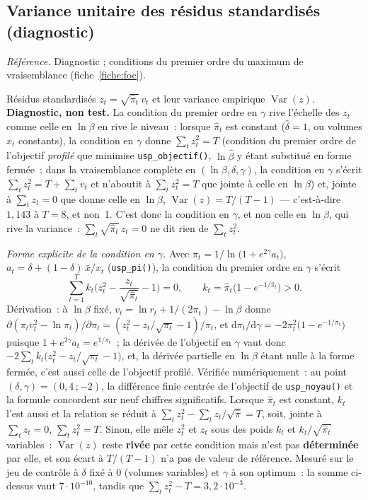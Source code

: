 \documentclass[a4paper,11pt]{article}
\newcommand{\code}[1]{\texttt{\small #1}}
\newcommand{\refl}[1]{{\small\textcolor{maincolor!70!black}{\textit{Référence.} #1}}\par\smallskip}
\newcounter{ficheid}
\newenvironment{fiche}[1]{%
  \stepcounter{ficheid}%
  \phantomsection
  \subsection{#1}%
  \label{fiche:\theficheid}%
}{%
  \end{description}\vspace{0.5em}%
}
\newcommand{\Cadre}{%
  \begin{description}[leftmargin=0pt, style=unboxed, itemsep=3pt, topsep=3pt, parsep=2pt]%
  \item[\textcolor{financeblue}{\textbf{1. Cadre, notations et hypothèses de validité (non testées).}}]}
\begin{document}
\begin{fiche}{Variance unitaire des résidus standardisés (diagnostic)}
\label{fiche:variance-unitaire}%
\refl{Diagnostic ; conditions du premier ordre du maximum de vraisemblance
(fiche~\ref{fiche:foc}).}
\Cadre
Résidus standardisés $z_t = \sqrt{\hat\pi_t}\,v_t$ et leur variance empirique
$\operatorname{Var}(z)$. \textbf{Diagnostic, non test.} La condition du premier ordre en $\gamma$
rive l'échelle des $z_t$ comme celle en $\ln\beta$ en rive le niveau~: lorsque $\hat\pi_t$ est
constant ($\hat\delta = 1$, ou volumes $x_t$ constants), la condition en $\gamma$ donne
$\sum_t z_t^2 = T$ (condition du premier ordre de l'objectif \emph{profilé} que minimise
\code{usp\_objectif()}, $\ln\hat\beta$ y étant substitué en forme fermée~; dans la
vraisemblance complète en $(\ln\beta,\delta,\gamma)$, la condition en $\gamma$ s'écrit
$\sum_t z_t^2 = T + \sum_t v_t$ et n'aboutit à $\sum_t z_t^2 = T$ que jointe à celle en
$\ln\beta$) et, jointe à $\sum_t z_t = 0$ que donne celle en $\ln\beta$,
$\operatorname{Var}(z) = T/(T-1)$ --- c'est-à-dire $1{,}143$ à $T = 8$,
et non~1. C'est donc la condition en $\gamma$, et non celle en $\ln\beta$, qui rive la variance~:
$\sum_t\sqrt{\hat\pi_t}\,z_t = 0$ ne dit rien de $\sum_t z_t^2$.

\emph{Forme explicite de la condition en $\gamma$.} Avec
$\pi_t = 1/\ln\!\big(1 + e^{2\gamma}a_t\big)$, $a_t = \delta + (1-\delta)\,\bar x/x_t$
(\code{usp\_pi()}), la condition du premier ordre en $\gamma$ s'écrit
\[
  \sum_{t=1}^{T} k_t\Big(z_t^2 - \frac{z_t}{\sqrt{\hat\pi_t}} - 1\Big) = 0,
  \qquad k_t = \hat\pi_t\big(1 - e^{-1/\hat\pi_t}\big) > 0 .
\]
Dérivation~: à $\ln\beta$ fixé, $v_t = \ln r_t + 1/(2\pi_t) - \ln\beta$ donne
$\partial(\pi_t v_t^2 - \ln\pi_t)/\partial\pi_t = (z_t^2 - z_t/\sqrt{\pi_t} - 1)/\pi_t$, et
$\mathrm{d}\pi_t/\mathrm{d}\gamma = -2\pi_t^2\big(1 - e^{-1/\pi_t}\big)$ puisque
$1 + e^{2\gamma}a_t = e^{1/\pi_t}$~; la dérivée de l'objectif en $\gamma$ vaut donc
$-2\sum_t k_t\big(z_t^2 - z_t/\sqrt{\pi_t} - 1\big)$, et, la dérivée partielle en $\ln\beta$ étant
nulle à la forme fermée, c'est aussi celle de l'objectif profilé. Vérifiée numériquement~: au
point $(\delta,\gamma) = (0{,}4\,;-2)$, la différence finie centrée de l'objectif de
\code{usp\_noyau()} et la formule concordent sur neuf chiffres significatifs. Lorsque
$\hat\pi_t$ est constant, $k_t$ l'est aussi et la relation se réduit à
$\sum_t z_t^2 - \sum_t z_t/\sqrt{\hat\pi} = T$, soit, jointe à $\sum_t z_t = 0$,
$\sum_t z_t^2 = T$. Sinon, elle mêle $z_t^2$ et $z_t$ sous des poids $k_t$ et
$k_t/\sqrt{\hat\pi_t}$ variables~: $\operatorname{Var}(z)$ reste \textbf{rivée} par cette
condition mais n'est pas \textbf{déterminée} par elle, et son écart à $T/(T-1)$ n'a pas de
valeur de référence. Mesuré sur le jeu de contrôle à $\delta$ fixé à $0$ (volumes variables) et
$\gamma$ à son optimum~: la somme ci-dessus vaut $7\cdot 10^{-10}$, tandis que
$\sum_t z_t^2 - T = 3{,}2\cdot 10^{-3}$.


\end{fiche}
\end{document}

